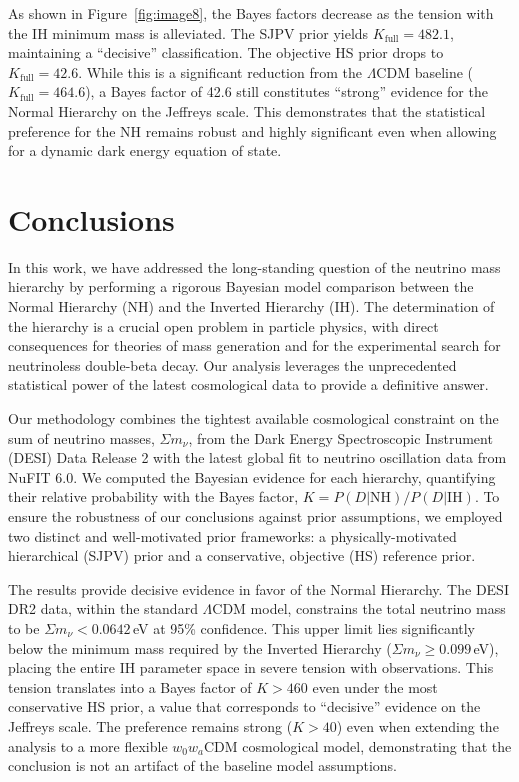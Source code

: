 \documentclass[]{article}
\begin{document}
As shown in Figure~\ref{fig:image8}, the Bayes factors decrease as the tension with the IH minimum mass is alleviated. The SJPV prior yields $K_{\text{full}} = 482.1$, maintaining a ``decisive'' classification. The objective HS prior drops to $K_{\text{full}} = 42.6$. While this is a significant reduction from the $\Lambda$CDM baseline ($K_{\text{full}} = 464.6$), a Bayes factor of 42.6 still constitutes ``strong'' evidence for the Normal Hierarchy on the Jeffreys scale. This demonstrates that the statistical preference for the NH remains robust and highly significant even when allowing for a dynamic dark energy equation of state.

\section{Conclusions}
\label{sec:conclusions}
In this work, we have addressed the long-standing question of the neutrino mass hierarchy by performing a rigorous Bayesian model comparison between the Normal Hierarchy (NH) and the Inverted Hierarchy (IH). The determination of the hierarchy is a crucial open problem in particle physics, with direct consequences for theories of mass generation and for the experimental search for neutrinoless double-beta decay. Our analysis leverages the unprecedented statistical power of the latest cosmological data to provide a definitive answer.

Our methodology combines the tightest available cosmological constraint on the sum of neutrino masses, $\Sigma m_\nu$, from the Dark Energy Spectroscopic Instrument (DESI) Data Release 2 with the latest global fit to neutrino oscillation data from NuFIT 6.0. We computed the Bayesian evidence for each hierarchy, quantifying their relative probability with the Bayes factor, $K = P(D|\text{NH}) / P(D|\text{IH})$. To ensure the robustness of our conclusions against prior assumptions, we employed two distinct and well-motivated prior frameworks: a physically-motivated hierarchical (SJPV) prior and a conservative, objective (HS) reference prior.

The results provide decisive evidence in favor of the Normal Hierarchy. The DESI DR2 data, within the standard $\Lambda$CDM model, constrains the total neutrino mass to be $\Sigma m_\nu < 0.0642$\,eV at 95\% confidence. This upper limit lies significantly below the minimum mass required by the Inverted Hierarchy ($\Sigma m_\nu \ge 0.099$\,eV), placing the entire IH parameter space in severe tension with observations. This tension translates into a Bayes factor of $K > 460$ even under the most conservative HS prior, a value that corresponds to ``decisive'' evidence on the Jeffreys scale. The preference remains strong ($K > 40$) even when extending the analysis to a more flexible $w_0w_a$CDM cosmological model, demonstrating that the conclusion is not an artifact of the baseline model assumptions.
\end{document}
